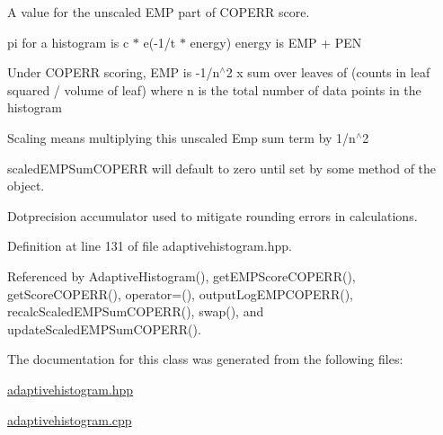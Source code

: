 \-A value for the unscaled \-E\-M\-P part of \-C\-O\-P\-E\-R\-R score. 

pi for a histogram is c $\ast$ e(-\/1/t $\ast$ energy) energy is \-E\-M\-P + \-P\-E\-N

\-Under \-C\-O\-P\-E\-R\-R scoring, \-E\-M\-P is -\/1/n$^\wedge$2 x sum over leaves of (counts in leaf squared / volume of leaf) where n is the total number of data points in the histogram

\-Scaling means multiplying this unscaled \-Emp sum term by 1/n$^\wedge$2

scaled\-E\-M\-P\-Sum\-C\-O\-P\-E\-R\-R will default to zero until set by some method of the object.

\-Dotprecision accumulator used to mitigate rounding errors in calculations. 

\-Definition at line 131 of file adaptivehistogram.\-hpp.



\-Referenced by \-Adaptive\-Histogram(), get\-E\-M\-P\-Score\-C\-O\-P\-E\-R\-R(), get\-Score\-C\-O\-P\-E\-R\-R(), operator=(), output\-Log\-E\-M\-P\-C\-O\-P\-E\-R\-R(), recalc\-Scaled\-E\-M\-P\-Sum\-C\-O\-P\-E\-R\-R(), swap(), and update\-Scaled\-E\-M\-P\-Sum\-C\-O\-P\-E\-R\-R().



\-The documentation for this class was generated from the following files\-:\begin{DoxyCompactItemize}
\item 
\hyperlink{adaptivehistogram_8hpp}{adaptivehistogram.\-hpp}\item 
\hyperlink{adaptivehistogram_8cpp}{adaptivehistogram.\-cpp}\end{DoxyCompactItemize}
